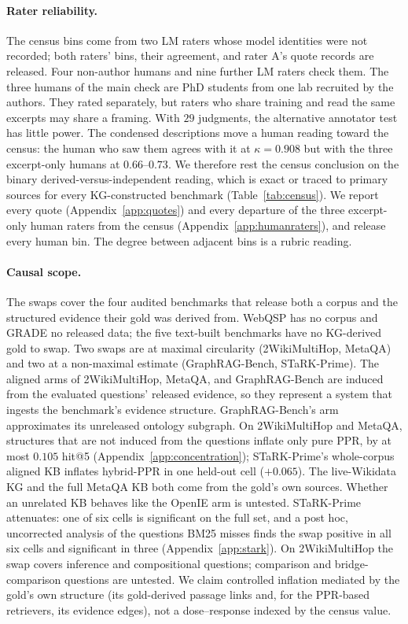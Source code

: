 \documentclass[11pt]{article}
\begin{document}
\paragraph{Rater reliability.} The census bins come from two LM raters whose model identities were not recorded; both raters' bins, their agreement, and rater A's quote records are released. Four non-author humans and nine further LM raters check them. The three humans of the main check are PhD students from one lab recruited by the authors. They rated separately, but raters who share training and read the same excerpts may share a framing. With $29$ judgments, the alternative annotator test has little power. The condensed descriptions move a human reading toward the census: the human who saw them agrees with it at $\kappa=0.908$ but with the three excerpt-only humans at $0.66$--$0.73$. We therefore rest the census conclusion on the binary derived-versus-independent reading, which is exact or traced to primary sources for every KG-constructed benchmark (Table~\ref{tab:census}). We report every quote (Appendix~\ref{app:quotes}) and every departure of the three excerpt-only human raters from the census (Appendix~\ref{app:humanraters}), and release every human bin. The degree between adjacent bins is a rubric reading.

\paragraph{Causal scope.} The swaps cover the four audited benchmarks that release both a corpus and the structured evidence their gold was derived from. WebQSP has no corpus and GRADE no released data; the five text-built benchmarks have no KG-derived gold to swap. Two swaps are at maximal circularity (2WikiMultiHop, MetaQA) and two at a non-maximal estimate (GraphRAG-Bench, STaRK-Prime). The aligned arms of 2WikiMultiHop, MetaQA, and GraphRAG-Bench are induced from the evaluated questions' released evidence, so they represent a system that ingests the benchmark's evidence structure. GraphRAG-Bench's arm approximates its unreleased ontology subgraph. On 2WikiMultiHop and MetaQA, structures that are not induced from the questions inflate only pure PPR, by at most $0.105$ hit@5 (Appendix~\ref{app:concentration}); STaRK-Prime's whole-corpus aligned KB inflates hybrid-PPR in one held-out cell ($+0.065$). The live-Wikidata KG and the full MetaQA KB both come from the gold's own sources. Whether an unrelated KB behaves like the OpenIE arm is untested. STaRK-Prime attenuates: one of six cells is significant on the full set, and a post hoc, uncorrected analysis of the questions BM25 misses finds the swap positive in all six cells and significant in three (Appendix~\ref{app:stark}). On 2WikiMultiHop the swap covers inference and compositional questions; comparison and bridge-comparison questions are untested. We claim controlled inflation mediated by the gold's own structure (its gold-derived passage links and, for the PPR-based retrievers, its evidence edges), not a dose--response indexed by the census value.
\end{document}
